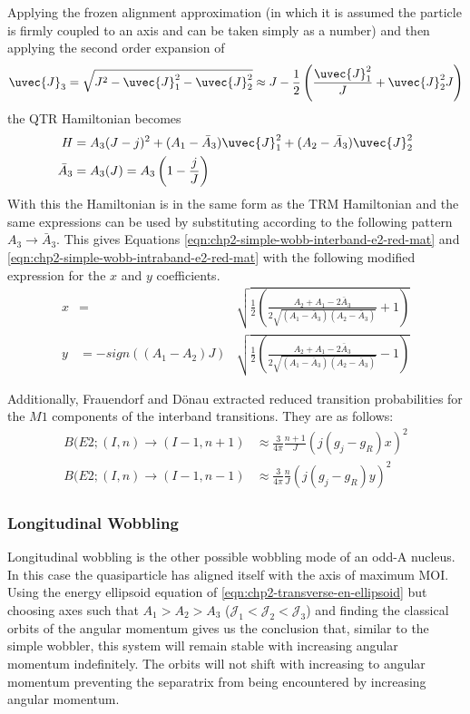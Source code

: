 Applying the frozen alignment approximation (in which it is assumed the particle is firmly coupled to an axis and can be taken simply as a number) and then applying the second order expansion of
\begin{equation}
\uvec{J}_3=\sqrt{J^2-\uvec{J}_1^2-\uvec{J}_2^2}\approx{}J-\frac{1}{2}\left(\frac{\uvec{J}_1^2}{J}+\uvec{J}_2^2{J}\right)
\end{equation}
the QTR Hamiltonian becomes
\begin{align}
H&=A_3(J-j)^2+(A_1-\bar{A}_3)\uvec{J}^2_1+(A_2-\bar{A}_3)\uvec{J}^2_2\\
\bar{A}_3&=A_3(J)=A_3\left(1-\frac{j}{J}\right)
\end{align}
With this the Hamiltonian is in the same form as the TRM Hamiltonian and the same expressions can be used by substituting according to the following pattern $A_3 \rightarrow\bar{A}_3$. This gives Equations \ref{eqn:chp2-simple-wobb-interband-e2-red-mat} and \ref{eqn:chp2-simple-wobb-intraband-e2-red-mat} with the following modified expression for the $x$ and $y$ coefficients.
\begin{align}
\label{eqn:chp2-simple-wobb-x-y-params-mod}
x&=&\sqrt{\frac{1}{2}\left(\frac{A_2+A_1-2\bar{A}_3}{2\sqrt{(A_1-\bar{A}_3)(A_2-\bar{A}_3)}}+1\right)}\\
y&=-sign((A_1-A_2)J)&\sqrt{\frac{1}{2}\left(\frac{A_2+A_1-2\bar{A}_3}{2\sqrt{(A_1-\bar{A}_3)(A_2-\bar{A}_3)}}-1\right)}\nonumber
\end{align}

Additionally, Frauendorf and D\"onau \cite{frauendorfTransverseWobbling} extracted reduced transition probabilities for the $M1$ components of the interband transitions. They are as follows:
\begin{align}
\label{eqn:chp2-simple-wobb-interband-m1-red-mat}
B(E2;(I,n)\rightarrow(I-1,n+1)&\approx\frac{3}{4\pi}\frac{n+1}{J}\left(j(g_j-g_R)x\right)^2\\
B(E2;(I,n)\rightarrow(I-1,n-1)&\approx\frac{3}{4\pi}\frac{n}{J}\left(j(g_j-g_R)y\right)^2
\end{align}

\subsubsection{Longitudinal Wobbling}
\label{sssec:models-wobbling-longitudinal-wobbling}
Longitudinal wobbling is the other possible wobbling mode of an odd-A nucleus. In this case the quasiparticle has aligned itself with the axis of maximum MOI. Using the energy ellipsoid equation of \ref{eqn:chp2-transverse-en-ellipsoid} but choosing axes such that $A_1>A_2>A_3$ ($\mathcal{J}_1<\mathcal{J}_2<\mathcal{J}_3$) and finding the classical orbits of the angular momentum gives us the conclusion that, similar to the simple wobbler, this system will remain stable with increasing angular momentum indefinitely. The orbits will not shift with increasing to angular momentum preventing the separatrix from being encountered by increasing angular momentum.


